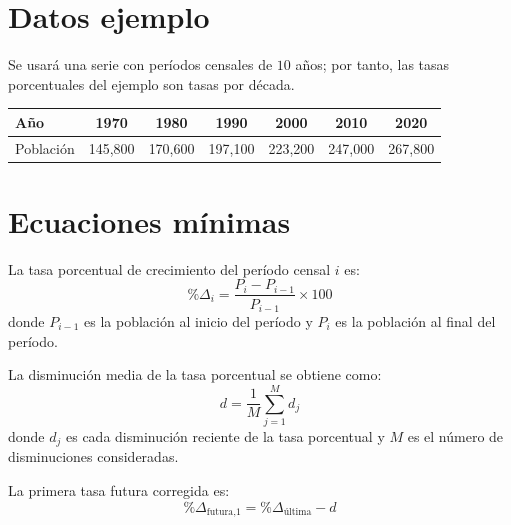 \documentclass[12pt]{article}
\begin{document}

\section{Datos ejemplo}
Se usará una serie con períodos censales de $10$ años; por tanto, las tasas porcentuales del ejemplo son tasas por década.

\begin{center}
\begin{tabular}{lcccccc}
\toprule
Año & 1970 & 1980 & 1990 & 2000 & 2010 & 2020 \\
\midrule
Población & 145,800 & 170,600 & 197,100 & 223,200 & 247,000 & 267,800 \\
\bottomrule
\end{tabular}
\end{center}

\section{Ecuaciones mínimas}
La tasa porcentual de crecimiento del período censal $i$ es:
\begin{equation}
\%\Delta_i=\frac{P_i-P_{i-1}}{P_{i-1}}\times 100
\end{equation}
donde $P_{i-1}$ es la población al inicio del período y $P_i$ es la población al final del período.

La disminución media de la tasa porcentual se obtiene como:
\begin{equation}
d=\frac{1}{M}\sum_{j=1}^{M} d_j
\end{equation}
donde $d_j$ es cada disminución reciente de la tasa porcentual y $M$ es el número de disminuciones consideradas.

La primera tasa futura corregida es:
\begin{equation}
\%\Delta_{\text{futura,1}}=\%\Delta_{\text{última}}-d
\end{equation}

\end{document}
